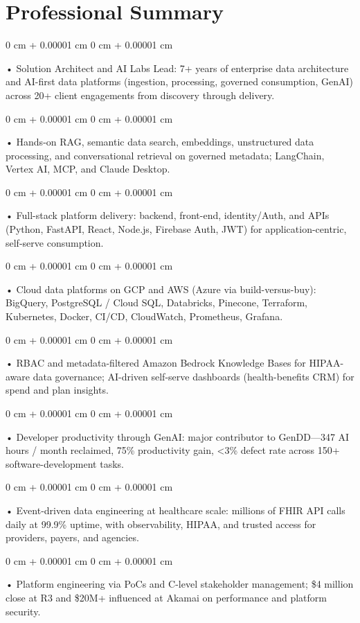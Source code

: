 \documentclass[10pt, letterpaper]{article}
\newenvironment{onecolentry}{
    \begin{adjustwidth}{
        0 cm + 0.00001 cm
    }{
        0 cm + 0.00001 cm
    }
}{
    \end{adjustwidth}
} %
\begin{document}
    \section{Professional Summary}
        \vspace{2 pt }
        \begin{onecolentry}
            • Solution Architect and AI Labs Lead: 7+ years of enterprise data architecture and AI-first data platforms (ingestion, processing, governed consumption, GenAI) across 20+ client engagements from discovery through delivery.
        \end{onecolentry}
        \begin{onecolentry}
            • Hands-on RAG, semantic data search, embeddings, unstructured data processing, and conversational retrieval on governed metadata; LangChain, Vertex AI, MCP, and Claude Desktop.
        \end{onecolentry}
        \begin{onecolentry}
            • Full-stack platform delivery: backend, front-end, identity/Auth, and APIs (Python, FastAPI, React, Node.js, Firebase Auth, JWT) for application-centric, self-serve consumption.
        \end{onecolentry}
        \begin{onecolentry}
            • Cloud data platforms on GCP and AWS (Azure via build-versus-buy): BigQuery, PostgreSQL / Cloud SQL, Databricks, Pinecone, Terraform, Kubernetes, Docker, CI/CD, CloudWatch, Prometheus, Grafana.
        \end{onecolentry}
        \begin{onecolentry}
            • RBAC and metadata-filtered Amazon Bedrock Knowledge Bases for HIPAA-aware data governance; AI-driven self-serve dashboards (health-benefits CRM) for spend and plan insights.
        \end{onecolentry}
        \begin{onecolentry}
            • Developer productivity through GenAI: major contributor to GenDD---347 AI hours / month reclaimed, 75\% productivity gain, <3\% defect rate across 150+ software-development tasks.
        \end{onecolentry}
        \begin{onecolentry}
            • Event-driven data engineering at healthcare scale: millions of FHIR API calls daily at 99.9\% uptime, with observability, HIPAA, and trusted access for providers, payers, and agencies.
        \end{onecolentry}
        \begin{onecolentry}
            • Platform engineering via PoCs and C-level stakeholder management; \$4 million close at R3 and \$20M+ influenced at Akamai on performance and platform security.
        \end{onecolentry}
\end{document}
